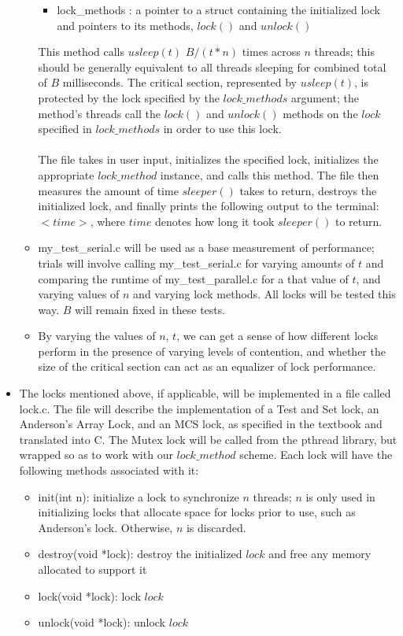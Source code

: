\documentclass[]{article}
\begin{document}
\begin{itemize}
\begin{itemize}
\begin{itemize}
			\item lock\_methods : a pointer to a struct containing the initialized lock and pointers to its methods, $lock()$ and $unlock()$
		\end{itemize}
		This method calls $usleep(t)$ $B / (t * n)$ times across $n$ threads; this should be generally equivalent to all threads sleeping for combined total of $B$ milliseconds. The critical section, represented by $usleep(t)$, is protected by the lock specified by the $lock\_methods$ argument; the method's threads call the $lock()$ and $unlock()$ methods on the $lock$ specified in $lock\_methods$ in order to use this lock.
		\\\\
		The file takes in user input, initializes the specified lock, initializes the appropriate $lock\_method$ instance, and calls this method. The file then measures the amount of time $sleeper()$ takes to return, destroys the initialized lock, and finally prints the following output to the terminal: $<time>$, where $time$ denotes how long it took $sleeper()$ to return.
		
		\item my\_test\_serial.c will be used as a base measurement of performance; trials will involve calling my\_test\_serial.c for varying amounts of $t$ and comparing the runtime of my\_test\_parallel.c for a that value of $t$, and varying values of $n$ and varying lock methods. All locks will be tested this way. $B$ will remain fixed in these tests.
		
		\item By varying the values of $n$, $t$, we can get a sense of how different locks perform in the presence of varying levels of contention, and whether the size of the critical section can act as an equalizer of lock performance.
	\end{itemize}
	\item The locks mentioned above, if applicable, will be implemented in a file called lock.c. The file will describe the implementation of a Test and Set lock, an Anderson's Array Lock, and an MCS lock, as specified in the textbook and translated into C. The Mutex lock will be called from the pthread library, but wrapped so as to work with our $lock\_method$ scheme. Each lock will have the following methods associated with it:
	\begin{itemize}
		\item init(int n):  initialize a lock to synchronize $n$ threads; $n$ is only used in initializing locks that allocate space for locks prior to use, such as Anderson's lock. Otherwise, $n$ is discarded.
		\item destroy(void *lock): destroy the initialized $lock$ and free any memory allocated to support it
		\item lock(void *lock): lock $lock$
		\item unlock(void *lock): unlock $lock$
	\end{itemize}
	

\end{itemize}
\end{document}
